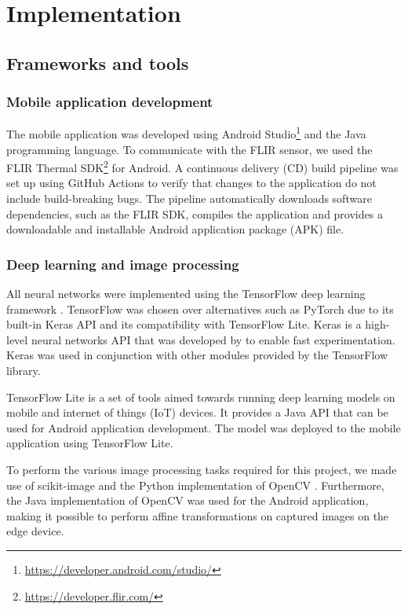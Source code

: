 \documentclass{l4proj}
\begin{document}
\chapter{Implementation}
\label{implementation}

\section{Frameworks and tools}

\subsection{Mobile application development}

The mobile application was developed using Android Studio\footnote{\url{https://developer.android.com/studio/}} and the Java programming language. To communicate with the FLIR sensor, we used the FLIR Thermal SDK\footnote{\url{https://developer.flir.com/}} for Android. A continuous delivery (CD) build pipeline was set up using GitHub Actions to verify that changes to the application do not include build-breaking bugs. The pipeline automatically downloads software dependencies, such as the FLIR SDK, compiles the application and provides a downloadable and installable Android application package (APK) file.

\subsection{Deep learning and image processing}

All neural networks were implemented using the TensorFlow deep learning framework \citep{abadi_TensorFlow_2016}. TensorFlow was chosen over alternatives such as PyTorch due to its built-in Keras API and its compatibility with TensorFlow Lite. Keras is a high-level neural networks API that was developed by \citet{chollet_keras_2015} to enable fast experimentation. Keras was used in conjunction with other modules provided by the TensorFlow library. 

TensorFlow Lite is a set of tools aimed towards running deep learning models on mobile and internet of things (IoT) devices. It provides a Java API that can be used for Android application development. The model was deployed to the mobile application using TensorFlow Lite.

To perform the various image processing tasks required for this project, we made use of scikit-image \citep{van_der_walt_scikit-image_2014} and the Python implementation of OpenCV \citep{bradski_opencv_2000}. Furthermore, the Java implementation of OpenCV was used for the Android application, making it possible to perform affine transformations on captured images on the edge device.
\end{document}
